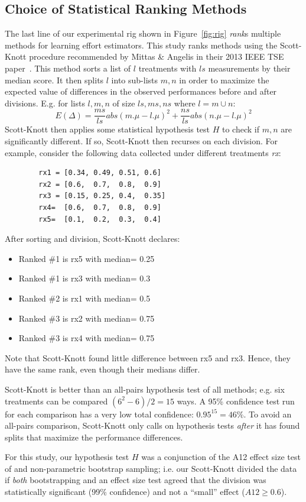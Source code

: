 \documentclass{sig-alternate}
\newcommand{\bi}{\begin{itemize}[leftmargin=0.4cm]}
\newcommand{\ei}{\end{itemize}}
\newcommand{\fig}[1]{Figure~\ref{fig:#1}}
\begin{document}
\subsection{Choice of Statistical Ranking Methods}\label{sect:stats}
The last line of our experimental rig shown in
\fig{rig} {\em rank}s multiple methods for learning
effort estimators.
This study ranks methods using the Scott-Knott
procedure recommended by Mittas \& Angelis in their 2013
IEEE TSE paper~\cite{mittas13}.  This method
sorts a list of $l$ treatments with $ls$ measurements by their median
score. It then
splits $l$ into sub-lists $m,n$ in order to maximize the expected value of
 differences  in the observed performances
before and after divisions. E.g. for lists $l,m,n$ of size $ls,ms,ns$ where $l=m\cup n$:
 \[E(\Delta)=\frac{ms}{ls}abs(m.\mu - l.\mu)^2 + \frac{ns}{ls}abs(n.\mu - l.\mu)^2\]
Scott-Knott then applies some statistical hypothesis test $H$ to check
if $m,n$ are significantly different. If so, Scott-Knott then recurses on each division.
For example, consider the following data collected under different treatments {\em rx}:

{\scriptsize \begin{verbatim}
        rx1 = [0.34, 0.49, 0.51, 0.6]
        rx2 = [0.6,  0.7,  0.8,  0.9]
        rx3 = [0.15, 0.25, 0.4,  0.35]
        rx4=  [0.6,  0.7,  0.8,  0.9]
        rx5=  [0.1,  0.2,  0.3,  0.4]
\end{verbatim}}
\noindent
After sorting and division, Scott-Knott declares:
\bi
\item Ranked \#1 is rx5 with median= 0.25
\item Ranked \#1 is rx3 with median= 0.3
\item Ranked \#2 is rx1 with median= 0.5
\item Ranked \#3 is rx2 with median= 0.75
\item Ranked \#3 is rx4 with median= 0.75
\ei
Note that Scott-Knott found  little
difference between rx5 and rx3. Hence,
they have the same rank, even though their medians differ.

Scott-Knott is better than an 
 all-pairs hypothesis test of all methods; e.g. six treatments
can be compared \mbox{$(6^2-6)/2=15$} ways. 
A 95\% confidence test run for each comparison has  a very low total confidence: 
\mbox{$0.95^{15} = 46$}\%.
To avoid an all-pairs comparison, Scott-Knott only calls on hypothesis
tests {\em after} it has found splits that maximize the performance differences.
 
For this study, our hypothesis test $H$ was a
conjunction of the A12 effect size test of  and
non-parametric bootstrap sampling; i.e. our
Scott-Knott divided the data if {\em both}
bootstrapping and an effect size test agreed that
the division was statistically significant (99\%
confidence) and not a ``small'' effect ($A12 \ge
0.6$).
\end{document}
